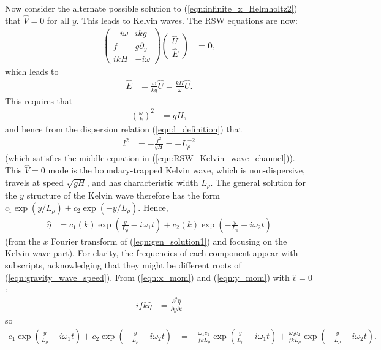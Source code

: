\documentclass[10pt,reqno]{amsart}
\newcommand{\bfz}{{\mathbf 0}}
\begin{document}
Now consider the alternate possible solution to (\ref{eqn:infinite_x_Helmholtz2}) that $\hat{V}=0$ for all $y$.
This leads to Kelvin waves.
The RSW equations are now:
\begin{align}
\begin{pmatrix}
- i \omega  & i k g \\
f & g \partial_y \\
i k H  & - i \omega
\end{pmatrix}
\begin{pmatrix}
\hat{U} \\
\hat{E}
\end{pmatrix} & = 
\bfz ,
\label{eqn:RSW_Kelvin_wave_channel}
\end{align}
which leads to
\begin{align}
\hat{E} & = \frac{\omega}{k g} \hat{U} = \frac{k H}{\omega} \hat{U} .
\end{align}
This requires that
\begin{align}
\left(\frac{\omega}{k}\right)^2 & = g H , \label{eqn:gravity_wave_speed}
\end{align}
and hence from the dispersion relation (\ref{eqn:l_definition}) that
\begin{align}
l^2 & = -\frac{f^2}{g H} = -L_\rho^{-2} 
\end{align}
(which satisfies the middle equation in (\ref{eqn:RSW_Kelvin_wave_channel})).
This $\hat{V}=0$ mode is the boundary-trapped Kelvin wave, which is non-dispersive, travels at speed $\sqrt{g H}$, and has characteristic width $L_\rho$.
The general solution for the $y$ structure of the Kelvin wave therefore has the form $c_1 \exp  \left(y/L_\rho \right) + c_2 \exp \left( - y/L_\rho \right)$.
Hence, 
\begin{align}
\hat{\eta} & = c_1(k) \exp  \left(\frac{y}{L_\rho} - i \omega_1 t \right) + c_2 (k) \exp \left( - \frac{y}{L_\rho} - i \omega_2 t \right) 
\label{eqn:Kwave_soln_eta}
\end{align}
(from the $x$ Fourier transform of (\ref{eqn:gen_solution1}) and focusing on the Kelvin wave part). 
For clarity, the frequencies of each component appear with subscripts, acknowledging that they might be different roots of (\ref{eqn:gravity_wave_speed}).
From (\ref{eqn:x_mom}) and (\ref{eqn:y_mom}) with $\hat{v} = 0$:
\begin{align}
i f k \hat{\eta} & = \frac{\partial^2 \hat{\eta}}{\partial y \partial t} 
\end{align}
so
\begin{align}
c_1 \exp  \left(\frac{y}{L_\rho} - i \omega_1 t \right) + c_2 \exp \left( - \frac{y}{L_\rho} - i \omega_2 t \right) 
&= -\frac{\omega_1 c_1}{f k L_\rho}  \exp  \left(\frac{y}{L_\rho} - i \omega_1 t \right) + \frac{\omega_2 c_2}{f k L_\rho} \exp \left( - \frac{y}{L_\rho} - i \omega_2 t \right) .
\end{align}
\end{document}
